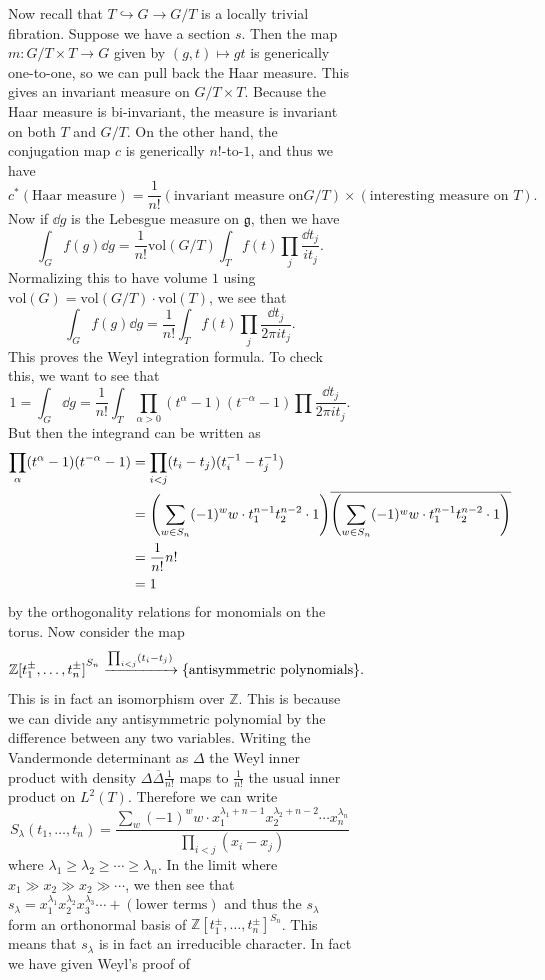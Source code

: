 \documentclass[leqno, openany]{memoir}
\theoremstyle{definition}
\theoremstyle{remark}
\theoremstyle{plain}
\theoremstyle{definition}
\theoremstyle{remark}
\newcommand{\Z}{\mathbb{Z}}
\newcommand{\mf}[1]{\mathfrak{#1}}
\newcommand{\mr}[1]{\mathrm{#1}}
\newcommand{\ol}[1]{\overline{#1}}
\begin{document}
\begin{figure}[H]
\begin{figure}[H]
Now recall that $T \hookrightarrow G \to G/T$ is a locally trivial fibration.
Suppose we have a section $s$. Then the map $m \colon G / T \times T \to G$
given by $(g,t) \mapsto gt$ is generically one-to-one, so we can pull back the
Haar measure. This gives an invariant measure on $G/T \times T$. Because the
Haar measure is bi-invariant, the measure is invariant on both $T$ and $G/T$.
On the other hand, the conjugation map $c$ is generically $n!$-to-$1$, and thus
we have \[ c^*(\text{Haar measure}) = \frac{1}{n!} (\text{invariant measure on
$G/T$}) \times (\text{interesting measure on $T$}). \] Now if $\dd{g}$ is the
Lebesgue measure on $\mf{g}$, then we have \[ \int_G f(g) \dd{g} = \frac{1}{n!}
\mr{vol}(G/T) \int_T f(t) \prod_j \frac{\dd{t_j}}{i t_j}. \] Normalizing this
to have volume $1$ using $\mr{vol}(G) = \mr{vol}(G/T) \cdot \mr{vol}(T)$, we
see that \[ \int_G f(g) \dd{g} = \frac{1}{n!} \int_T f(t) \prod_j
    \frac{\dd{t_j}}{2 \pi i t_j}. \] This proves the Weyl integration formula.
    To check this, we want to see that \[ 1 = \int_G \dd{g} = \frac{1}{n!}
    \int_T \prod_{\alpha > 0} (t^{\alpha}-1)(t^{-\alpha}-1) \prod
\frac{\dd{t_j}}{2 \pi i t_j}. \] But then the integrand can be written as
\begin{align*} \prod_{\alpha} (t^{\alpha} - 1)(t^{-\alpha}-1) &= \prod_{i<j}
    (t_i - t_j)(t_i^{-1} - t_j^{-1}) \\ &= \qty( \sum_{w \in S_n} (-1)^w w
    \cdot t_1^{n-1} t_2^{n-2} \cdot 1 )\ol{\qty( \sum_{w \in S_n} (-1)^w w
    \cdot t_1^{n-1} t_2^{n-2} \cdot 1 )} \\ &= \frac{1}{n!} n! \\ &= 1
    \end{align*} by the orthogonality relations for monomials on the torus. Now
    consider the map \[ {\Z[t_1^{\pm}, \ldots, t_n^{\pm}]}^{S_n}
    \xrightarrow{\prod_{i<j}(t_i - t_j)} \qty{\text{antisymmetric
polynomials}}. \] This is in fact an isomorphism over $\Z$. This is because we
can divide any antisymmetric polynomial by the difference between any two
variables. Writing the Vandermonde determinant as $\Delta$ the Weyl inner
product with density $\Delta \ol{\Delta} \frac{1}{n!}$ maps to $\frac{1}{n!}$
the usual inner product on $L^2(T)$. Therefore we can write \[ S_{\lambda}(t_1,
\ldots, t_n) = \frac{\sum_w (-1)^w w \cdot x_1^{\lambda_1 +n-1} x_2^{\lambda_2
+ n-2} \cdots x_n^{\lambda_n}}{\prod_{i<j} (x_i - x_j)} \] where $\lambda_1
\geq \lambda_2 \geq \cdots \geq \lambda_n$. In the limit where $x_1 \gg x_2 \gg
x_2 \gg \cdots$, we then see that $s_{\lambda} = x_1^{\lambda_1}
x_2^{\lambda_2} x_3^{\lambda_3} \cdots + (\text{lower terms})$ and thus the
$s_{\lambda}$ form an orthonormal basis of ${\Z[t_1^{\pm}, \ldots,
t_n^{\pm}]}^{S_n}$. This means that $s_{\lambda}$ is in fact an irreducible
character. In fact we have given Weyl's proof of


\end{figure}
\end{figure}
\end{document}
